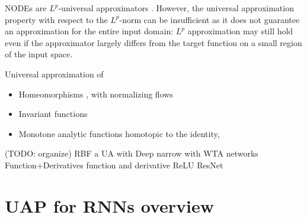 \documentclass{article}
\newcommand{\ascomment}[1]{\textcolor{ascolor}{(#1)}}
\theoremstyle{definition} \newtheorem{definition}{Definition}
\theoremstyle{remark} \newtheorem{remark}{Remark}
\newcounter{ct}
\begin{document}
 
NODEs are $L^p$-universal approximators \citep{li2022deep,li2022deeparxiv}.
However, the universal approximation property with respect to the $L^p$-norm can be insufficient as it does not guarantee an approximation for the entire input domain:
 $L^p$ approximation may still hold even if the approximator largely differs from the target function on a small region of the input space.



Universal approximation of 
\begin{itemize}
\item Homeomorphisms \citep{zhang2020approximation}, with normalizing flows \citep{papamakarios2021normalizing}
\item Invariant functions\citep{li2022deep}
\item Monotone analytic functions homotopic to the identity\citep{tabuada2020universal}, \citep{tabuada2022universal}
\end{itemize}


\ascomment{TODO: organize}
RBF\citep{park1991universal}
a\citep{marchi2021training}
\citep{lowe1988multivariable}
\citep{mhaskar1997neural}
\citep{leshno1993multilayer}
UA with Deep narrow \citep{kidger2020universal}
with WTA networks \citep{maass2000wta}
Function+Derivatives \citep{hornik1990universal}
function and derivative \citep{li1996simultaneous}
ReLU\citep{huang2020relu}
ResNet\citep{lin2018resnet}





\newpage
\section{UAP for RNNs overview}
\end{document}
